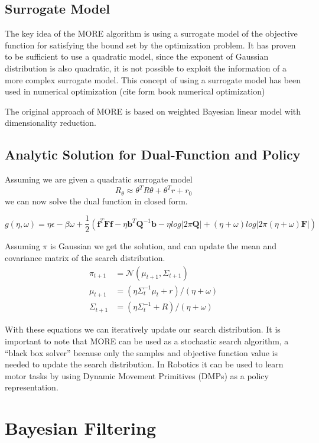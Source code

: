 \subsection{Surrogate Model}
The key idea of the MORE algorithm is using a surrogate model of the objective function
for satisfying the bound set by the optimization problem. It has proven to be
sufficient to use a quadratic model, since the exponent of Gaussian distribution
is also quadratic, it is not possible to exploit the information of a more
complex surrogate model. This concept of using a surrogate model has been used
in numerical optimization (cite form book numerical optimization)

The original approach of MORE is based on weighted Bayesian linear model with
dimensionality reduction.

\subsection{Analytic Solution for Dual-Function and Policy}
Assuming we are given a quadratic surrogate model
$$ R_\theta \approx \theta^T R \theta + \theta^T r + r_0 $$
we can now solve the dual function in closed form.

$$ g(\eta, \omega) = \eta \epsilon - \beta \omega
+ \frac{1}{2} \left(\mathbf{f}^T \mathbf{F} \mathbf{f} - \eta \mathbf{b}^T \mathbf{Q}^{-1}
\mathbf{b} - \eta log |2\pi \mathbf{Q}| + (\eta + \omega) log |2\pi (\eta + \omega)
\mathbf{F}| \right) $$

Assuming $\pi$ is Gaussian we get the solution, and can update the mean and covariance matrix
of the search distribution. 
\begin{align} \label{policy_update}
  \pi_{t+1} &= \mathcal{N}(\mu_{t+1}, \Sigma_{t+1}) \\
  \mu_{t+1} &= (\eta \Sigma_{t}^{-1}\mu_t + r) / (\eta + \omega) \\
  \Sigma_{t+1} &= (\eta \Sigma_t^{-1} + R) / (\eta + \omega)
\end{align}

With these equations we can iteratively update our search distribution.
It is important to note that MORE can be used as a stochastic search algorithm,
a ``black box solver'' because only the samples and objective function value
is needed to update the search distribution.
In Robotics it can be used to learn motor tasks by using Dynamic Movement Primitives
(DMPs) as a policy representation.

\section{Bayesian Filtering}


